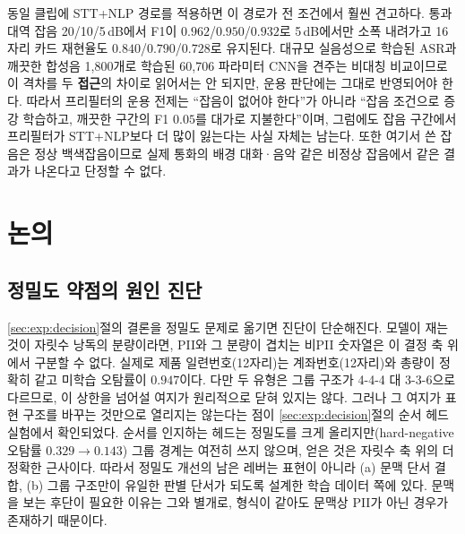 \documentclass[10pt,twocolumn]{article}
\renewcommand{\emph}[1]{\textbf{#1}}
\begin{document}
동일 클립에 STT+NLP 경로를 적용하면 이 경로가 전 조건에서 훨씬 견고하다. 통과대역 잡음
20/10/5\,dB에서 F1이 $0.962$/$0.950$/$0.932$로 5\,dB에서만 소폭 내려가고 16자리 카드 재현율도
$0.840$/$0.790$/$0.728$로 유지된다. 대규모 실음성으로 학습된 ASR과 깨끗한 합성음 1{,}800개로
학습된 60{,}706 파라미터 CNN을 견주는 비대칭 비교이므로 이 격차를 두 \emph{접근}의 차이로 읽어서는
안 되지만, 운용 판단에는 그대로 반영되어야 한다. 따라서 프리필터의 운용 전제는 ``잡음이 없어야
한다''가 아니라 ``잡음 조건으로 증강 학습하고, 깨끗한 구간의 F1 $0.05$를 대가로 지불한다''이며,
그럼에도 잡음 구간에서 프리필터가 STT+NLP보다 더 많이 잃는다는 사실 자체는 남는다. 또한 여기서
쓴 잡음은 정상 백색잡음이므로 실제 통화의 배경 대화·음악 같은 비정상 잡음에서 같은 결과가
나온다고 단정할 수 없다.

\section{논의}\label{sec:discuss}

\subsection{정밀도 약점의 원인 진단}
\ref{sec:exp:decision}절의 결론을 정밀도 문제로 옮기면 진단이 단순해진다. 모델이 재는 것이
자릿수 낭독의 분량이라면, PII와 그 분량이 겹치는 비PII 숫자열은 이 결정 축 위에서 구분할 수
없다. 실제로 제품 일련번호(12자리)는 계좌번호(12자리)와 총량이 정확히 같고 미학습 오탐률이
$0.947$이다. 다만 두 유형은 그룹 구조가 4-4-4 대 3-3-6으로 다르므로, 이 상한을 넘어설 여지가 원리적으로
닫혀 있지는 않다. 그러나 그 여지가 표현 구조를 바꾸는 것만으로 열리지는 않는다는 점이
\ref{sec:exp:decision}절의 순서 헤드 실험에서 확인되었다. 순서를 인지하는 헤드는 정밀도를 크게
올리지만(hard-negative 오탐률 $0.329\to0.143$) 그룹 경계는 여전히 쓰지 않으며, 얻은 것은 자릿수
축 위의 더 정확한 근사이다. 따라서 정밀도 개선의 남은 레버는 표현이 아니라 (a) 문맥 단서 결합,
(b) 그룹 구조만이 유일한 판별 단서가 되도록 설계한 학습 데이터 쪽에 있다. 문맥을 보는 후단이 필요한 이유는 그와 별개로,
형식이 같아도 문맥상 PII가 아닌 경우가 존재하기 때문이다.
\end{document}
